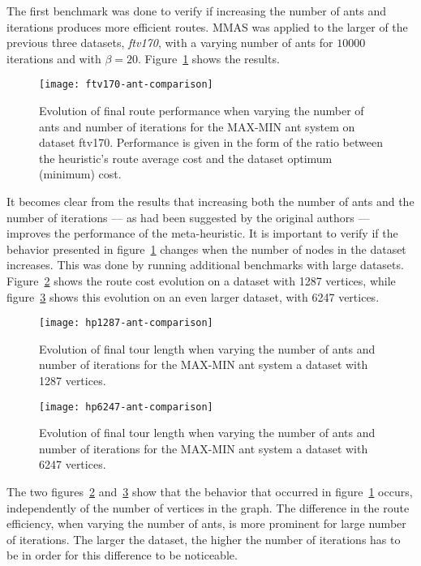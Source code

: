 The first benchmark was done to verify if increasing the number of ants and
iterations produces more efficient routes. MMAS was applied to the larger of
the previous three datasets, \textit{ftv170}, with a varying number of ants for
$10000$ iterations and with $\beta=20$.  Figure~\ref{fig:mmas-ants-runs-small}
shows the results.

\begin{figure}[h!]
  \centering
  \texttt{[image: ftv170-ant-comparison]}
  \caption{Evolution of final route performance when varying the number of ants
  and number of iterations for the MAX-MIN ant system on dataset ftv170. Performance
  is given in the form of the ratio between the heuristic's route average cost
  and the dataset optimum (minimum) cost.}
  \label{fig:mmas-ants-runs-small}
\end{figure}

It becomes clear from the results that increasing both the number of ants and
the number of iterations --- as had been suggested by the original authors ---
improves the performance of the meta-heuristic.  It is important to verify if
the behavior presented in figure~\ref{fig:mmas-ants-runs-small} changes when the
number of nodes in the dataset increases. This was done by running additional
benchmarks with large datasets. Figure~\ref{fig:mmas-ants-runs-large} shows the
route cost evolution on a dataset with 1287 vertices, while
figure~\ref{fig:mmas-ants-runs-xl} shows this evolution on an even larger
dataset, with 6247 vertices.

\newpage
\begin{figure}[h!]
  \centering
  \texttt{[image: hp1287-ant-comparison]}
  \caption{Evolution of final tour length when varying the number of ants and
  number of iterations for the MAX-MIN ant system a dataset with 1287 vertices.}
  \label{fig:mmas-ants-runs-large}
\end{figure}

\begin{figure}[h!]
  \centering
  \texttt{[image: hp6247-ant-comparison]}
  \caption{Evolution of final tour length when varying the number of ants and
  number of iterations for the MAX-MIN ant system a dataset with 6247 vertices.}
  \label{fig:mmas-ants-runs-xl}
\end{figure}

The two figures~\ref{fig:mmas-ants-runs-large} and~\ref{fig:mmas-ants-runs-xl}
show that the behavior that occurred in figure~\ref{fig:mmas-ants-runs-small}
occurs, independently of the number of vertices in the graph. The difference in
the route efficiency, when varying the number of ants, is more prominent for
large number of iterations. The larger the dataset, the higher the number of
iterations has to be in order for this difference to be noticeable.

